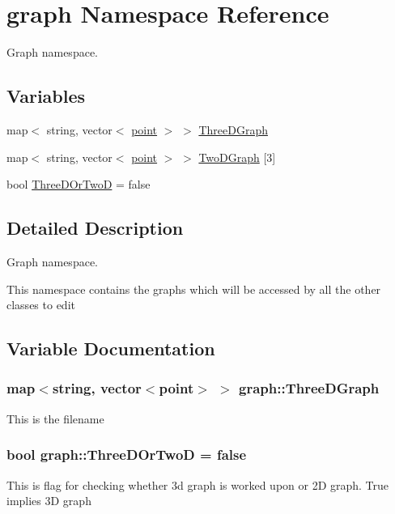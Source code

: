 \hypertarget{namespacegraph}{}\section{graph Namespace Reference}
\label{namespacegraph}


Graph namespace.  


\subsection*{Variables}
\begin{DoxyCompactItemize}
\item 
map$<$ string, vector$<$ \hyperlink{structpoint}{point} $>$ $>$ \hyperlink{namespacegraph_a4315e19997c8b99a403fed5968799e10}{Three\+D\+Graph}
\item 
map$<$ string, vector$<$ \hyperlink{structpoint}{point} $>$ $>$ \hyperlink{namespacegraph_a18be037bbd2748e849072b9f5017c97e}{Two\+D\+Graph} \mbox{[}3\mbox{]}
\item 
bool \hyperlink{namespacegraph_aaa8a7bf9ccfc70dd98f403db09e1d57f}{Three\+D\+Or\+TwoD} = false
\end{DoxyCompactItemize}


\subsection{Detailed Description}
Graph namespace. 

This namespace contains the graphs which will be accessed by all the other classes to edit 

\subsection{Variable Documentation}
\subsubsection[{\texorpdfstring{Three\+D\+Graph}{ThreeDGraph}}]{\setlength{\rightskip}{0pt plus 5cm}map$<$string, vector$<${\bf point}$>$ $>$ graph\+::\+Three\+D\+Graph}\hypertarget{namespacegraph_a4315e19997c8b99a403fed5968799e10}{}\label{namespacegraph_a4315e19997c8b99a403fed5968799e10}
This is the filename 
\subsubsection[{\texorpdfstring{Three\+D\+Or\+TwoD}{ThreeDOrTwoD}}]{\setlength{\rightskip}{0pt plus 5cm}bool graph\+::\+Three\+D\+Or\+TwoD = false}\hypertarget{namespacegraph_aaa8a7bf9ccfc70dd98f403db09e1d57f}{}\label{namespacegraph_aaa8a7bf9ccfc70dd98f403db09e1d57f}
This is flag for checking whether 3d graph is worked upon or 2D graph. True implies 3D graph 
